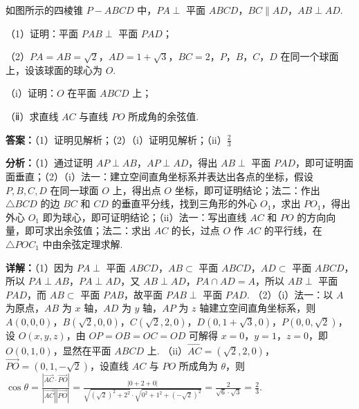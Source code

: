 \begin{question}[points=15]
如图所示的四棱锥 $P-ABCD$ 中，$PA \perp$ 平面 $ABCD$，$BC \parallel AD$，$AB \perp AD$.



（1）证明：平面 $PAB \perp$ 平面 $PAD$；



（2）$PA = AB = \sqrt{2}$，$AD = 1+\sqrt{3}$，$BC = 2$，$P$，$B$，$C$，$D$ 在同一个球面上，设该球面的球心为 $O$.



（i）证明：$O$ 在平面 $ABCD$ 上；



（ⅱ）求直线 $AC$ 与直线 $PO$ 所成角的余弦值.
\begin{solution}
\textbf{答案：}（1）证明见解析；（2）（i）证明见解析；（ii）$\frac{2}{3}$

\textbf{分析：}（1）通过证明 $AP \perp AB$，$AP \perp AD$，得出 $AB \perp$ 平面 $PAD$，即可证明面面垂直；（2）（i）法一：建立空间直角坐标系并表达出各点的坐标，假设 $P,B,C,D$ 在同一球面 $O$ 上，得出点 $O$ 坐标，即可证明结论；法二：作出 $\triangle BCD$ 的边 $BC$ 和 $CD$ 的垂直平分线，找到三角形的外心 $O_1$，求出 $PO_1$，得出外心 $O_1$ 即为球心，即可证明结论；（ii）法一：写出直线 $AC$ 和 $PO$ 的方向向量，即可求出余弦值；法二：求出 $AC$ 的长，过点 $O$ 作 $AC$ 的平行线，在 $\triangle POC_1$ 中由余弦定理求解.

\textbf{详解：}（1）因为 $PA \perp$ 平面 $ABCD$，$AB \subset$ 平面 $ABCD$，$AD \subset$ 平面 $ABCD$，所以 $PA \perp AB$，$PA \perp AD$，又 $AB \perp AD$，$PA \cap AD = A$，所以 $AB \perp$ 平面 $PAD$，而 $AB \subset$ 平面 $PAB$，故平面 $PAB \perp$ 平面 $PAD$.
（2）（i）法一：以 $A$ 为原点，$AB$ 为 $x$ 轴，$AD$ 为 $y$ 轴，$AP$ 为 $z$ 轴建立空间直角坐标系，则 $A(0,0,0)$，$B(\sqrt{2},0,0)$，$C(\sqrt{2},2,0)$，$D(0,1+\sqrt{3},0)$，$P(0,0,\sqrt{2})$，设 $O(x,y,z)$，由 $OP=OB=OC=OD$ 可解得 $x=0$，$y=1$，$z=0$，即 $O(0,1,0)$，显然在平面 $ABCD$ 上.
（ii）$\overrightarrow{AC} = (\sqrt{2},2,0)$，$\overrightarrow{PO} = (0,1,-\sqrt{2})$，设直线 $AC$ 与 $PO$ 所成角为 $\theta$，则 $\cos\theta = \frac{|\overrightarrow{AC} \cdot \overrightarrow{PO}|}{|\overrightarrow{AC}| |\overrightarrow{PO}|} = \frac{|0+2+0|}{\sqrt{(\sqrt{2})^2+2^2} \cdot \sqrt{0^2+1^2+(-\sqrt{2})^2}} = \frac{2}{\sqrt{6} \cdot \sqrt{3}} = \frac{2}{3}$.
\end{solution}
\end{question}

